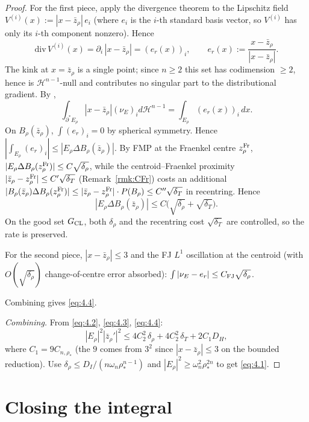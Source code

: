 \documentclass[11pt]{article}
\theoremstyle{definition}
\newcommand{\rstar}{\rho_{*}}
\newcommand{\zbar}{\bar z_{\rho}}
\begin{document}
\begin{proof}
For the first piece, apply the divergence theorem to the Lipschitz
field $V^{(i)}(x):=|x-\zbar|\,e_i$ (where $e_i$ is the $i$-th standard
basis vector, so $V^{(i)}$ has only its $i$-th component nonzero).
Hence
\[
   \mathrm{div}\,V^{(i)}(x)
   = \partial_i\,|x-\zbar|
   = (e_r(x))_i,
   \qquad e_r(x):=\frac{x-\zbar}{|x-\zbar|}.
\]
The kink at $x=\zbar$ is a single point; since $n\ge 2$ this set has
codimension $\ge 2$, hence is $\mathcal H^{n-1}$-null and contributes no
singular part to the distributional gradient. By
\cite[Thm.~15.9]{Maggi2012},
\begin{equation}\label{eq:4.6}
   \int_{\partial^*E_\rho}|x-\zbar|(\nu_E)_i d\mathcal H^{n-1}
   =\int_{E_\rho}(e_r(x))_i\,dx.
\end{equation}
On $B_\rho(\zbar)$, $\int(e_r)_i=0$ by spherical symmetry. Hence
$|\int_{E_\rho}(e_r)_i|\le|E_\rho\Delta B_\rho(\zbar)|$. By FMP
\cite{FMP2010} at the Fraenkel centre $z^{\rm Fr}_\rho$,
$|E_\rho\Delta B_\rho(z^{\rm Fr}_\rho)|\le C\sqrt{\delta_\rho}$, while
the centroid--Fraenkel proximity
$|\zbar-z^{\rm Fr}_\rho|\le C'\sqrt{\delta_T}$ (Remark~\ref{rmk:CFr})
costs an additional
$|B_\rho(\zbar)\Delta B_\rho(z^{\rm Fr}_\rho)|
\le |\zbar-z^{\rm Fr}_\rho|\cdot P(B_\rho)
\le C''\sqrt{\delta_T}$
in recentring. Hence
\[
   |E_\rho\Delta B_\rho(\zbar)|
   \le C\bigl(\sqrt{\delta_\rho}+\sqrt{\delta_T}\bigr).
\]
On the good set $G_{\rm CL}$, both $\delta_\rho$ and the recentring
cost $\sqrt{\delta_T}$ are controlled, so the rate is preserved.

For the second piece, $|x-\zbar|\le 3$ and the FJ $L^1$ oscillation
\cite{FJ2014} at the centroid (with $O(\sqrt{\delta_\rho})$ change-of-centre
error absorbed): $\int|\nu_E-e_r|\le C_{\rm FJ}\sqrt{\delta_\rho}$.

Combining gives \eqref{eq:4.4}.

\emph{Combining.} From \eqref{eq:4.2}, \eqref{eq:4.3}, \eqref{eq:4.4}:
\[
   |E_\rho|^2|\bar z_\rho'|^2
   \le 4C_2^2\,\delta_\rho + 4C_2^2\,\delta_T + 2C_1 D_H,
\]
where $C_1=9C_{n,\rstar}$ (the $9$ comes from $3^2$ since
$|x-\zbar|\le 3$ on the bounded reduction). Use
$\delta_\rho\le D_I/(n\omega_n\rstar^{n-1})$ and
$|E_\rho|^2\ge\omega_n^2\rstar^{2n}$ to get \eqref{eq:4.1}.
\end{proof}

\section{Closing the integral}\label{sec:closing}
\end{document}
